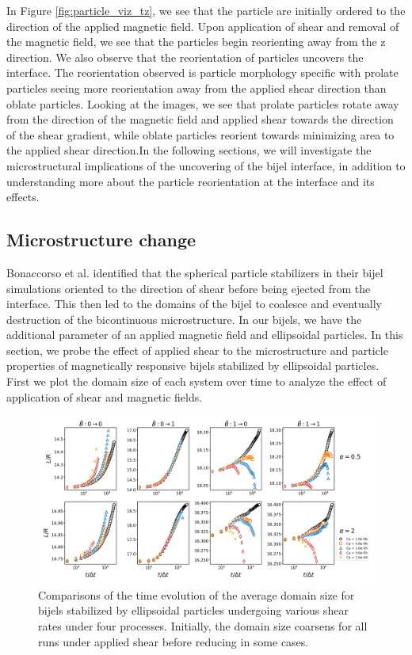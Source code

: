 In Figure \ref{fig:particle_viz_tz}, we see that the particle are initially ordered to the direction of the applied magnetic field. Upon application of shear and removal
of the magnetic field, we see that the particles begin reorienting away from the z direction. We also observe that the reorientation of particles uncovers the interface.
The reorientation observed is particle morphology specific with prolate particles seeing more reorientation away from the applied shear direction than oblate particles.
Looking at the images, we see that prolate particles rotate away from the direction of the magnetic field and applied shear towards the direction of the shear gradient,
while oblate particles reorient towards minimizing area to the applied shear direction.In the following sections, we will investigate the microstructural implications of
the uncovering of the bijel interface, in addition to understanding more about the particle reorientation at the interface and its effects.

\subsection{Microstructure change}

Bonaccorso et al. identified that the spherical particle stabilizers in their bijel simulations oriented to the direction of shear before being
ejected from the interface. \cite{bonaccorso_shear_2020} This then led to the domains of the bijel to coalesce and eventually destruction of the
bicontinuous microstructure. \cite{bonaccorso_shear_2020} In our bijels, we have the additional parameter of an applied magnetic field and
ellipsoidal particles. In this section, we probe the effect of applied shear to the microstructure and particle properties of magnetically
responsive bijels stabilized by ellipsoidal particles. First we plot the domain size of each system over time to analyze the effect of application of 
shear and magnetic fields.

\begin{figure} 
    \centering 
    \includegraphics[scale=0.3]{../figures/results/paper3/domain_size-time_compare.png} 
    \caption{Comparisons of the time evolution of the average domain size for bijels stabilized by ellipsoidal particles undergoing
             various shear rates under four processes. Initially, the domain size coarsens for all runs under applied shear before
             reducing in some cases.} 
    \label{fig:domain_size_time_shear} 
\end{figure}

